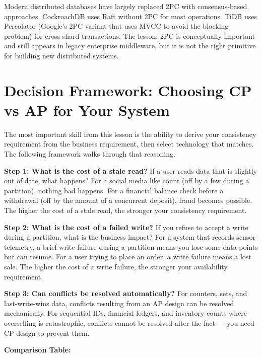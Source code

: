 \documentclass[11pt,a4paper]{article}
\begin{document}
Modern distributed databases have largely replaced 2PC with consensus-based approaches. CockroachDB uses Raft without 2PC for most operations. TiDB uses Percolator (Google's 2PC variant that uses MVCC to avoid the blocking problem) for cross-shard transactions. The lesson: 2PC is conceptually important and still appears in legacy enterprise middleware, but it is not the right primitive for building new distributed systems.

\section{Decision Framework: Choosing CP vs AP for Your System}

The most important skill from this lesson is the ability to derive your consistency requirement from the business requirement, then select technology that matches. The following framework walks through that reasoning.

\textbf{Step 1: What is the cost of a stale read?} If a user reads data that is slightly out of date, what happens? For a social media like count (off by a few during a partition), nothing bad happens. For a financial balance check before a withdrawal (off by the amount of a concurrent deposit), fraud becomes possible. The higher the cost of a stale read, the stronger your consistency requirement.

\textbf{Step 2: What is the cost of a failed write?} If you refuse to accept a write during a partition, what is the business impact? For a system that records sensor telemetry, a brief write failure during a partition means you lose some data points but can resume. For a user trying to place an order, a write failure means a lost sale. The higher the cost of a write failure, the stronger your availability requirement.

\textbf{Step 3: Can conflicts be resolved automatically?} For counters, sets, and last-write-wins data, conflicts resulting from an AP design can be resolved mechanically. For sequential IDs, financial ledgers, and inventory counts where overselling is catastrophic, conflicts cannot be resolved after the fact --- you need CP design to prevent them.

\vspace{0.5em}
\noindent\textbf{Comparison Table:}
\end{document}
